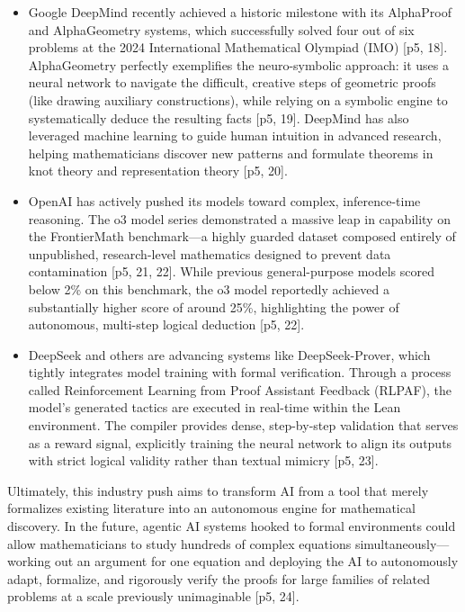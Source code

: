 \begin{itemize}
    \item Google DeepMind recently achieved a historic milestone with its AlphaProof and AlphaGeometry systems, which successfully solved four out of six problems at the 2024 International Mathematical Olympiad (IMO) [p5, 18]. AlphaGeometry perfectly exemplifies the neuro-symbolic approach: it uses a neural network to navigate the difficult, creative steps of geometric proofs (like drawing auxiliary constructions), while relying on a symbolic engine to systematically deduce the resulting facts [p5, 19]. DeepMind has also leveraged machine learning to guide human intuition in advanced research, helping mathematicians discover new patterns and formulate theorems in knot theory and representation theory [p5, 20].
    \item OpenAI has actively pushed its models toward complex, inference-time reasoning. The o3 model series demonstrated a massive leap in capability on the FrontierMath benchmark—a highly guarded dataset composed entirely of unpublished, research-level mathematics designed to prevent data contamination [p5, 21, 22]. While previous general-purpose models scored below 2\% on this benchmark, the o3 model reportedly achieved a substantially higher score of around 25\%, highlighting the power of autonomous, multi-step logical deduction [p5, 22].
    \item DeepSeek and others are advancing systems like DeepSeek-Prover, which tightly integrates model training with formal verification. Through a process called Reinforcement Learning from Proof Assistant Feedback (RLPAF), the model's generated tactics are executed in real-time within the Lean environment. The compiler provides dense, step-by-step validation that serves as a reward signal, explicitly training the neural network to align its outputs with strict logical validity rather than textual mimicry [p5, 23].
\end{itemize}

Ultimately, this industry push aims to transform AI from a tool that merely formalizes existing literature into an autonomous engine for mathematical discovery. In the future, agentic AI systems hooked to formal environments could allow mathematicians to study hundreds of complex equations simultaneously—working out an argument for one equation and deploying the AI to autonomously adapt, formalize, and rigorously verify the proofs for large families of related problems at a scale previously unimaginable [p5, 24].

